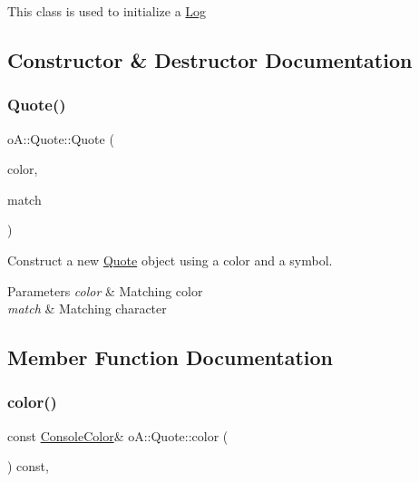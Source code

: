 This class is used to initialize a \mbox{\hyperlink{classo_a_1_1_log}{Log}} 

\subsection{Constructor \& Destructor Documentation}
\mbox{\label{classo_a_1_1_quote_a106d98164983c0d65e8b181275ab763b}} 
\subsubsection{\texorpdfstring{Quote()}{Quote()}}
{\footnotesize\ttfamily o\+A\+::\+Quote\+::\+Quote (\begin{DoxyParamCaption}\item[{const \mbox{\hyperlink{namespaceo_a_a747e07c1977a29f3e1d38683043ec927}{Console\+Color}} \&}]{color,  }\item[{char}]{match }\end{DoxyParamCaption})\hspace{0.3cm}{\ttfamily [inline]}}



Construct a new \mbox{\hyperlink{classo_a_1_1_quote}{Quote}} object using a color and a symbol. 


\begin{DoxyParams}{Parameters}
{\em color} & Matching color \\
\hline
{\em match} & Matching character \\
\hline
\end{DoxyParams}


\subsection{Member Function Documentation}
\mbox{\label{classo_a_1_1_quote_a2230c25c43af7317d5ab5785b382f2ce}} 
\subsubsection{\texorpdfstring{color()}{color()}}
{\footnotesize\ttfamily const \mbox{\hyperlink{namespaceo_a_a747e07c1977a29f3e1d38683043ec927}{Console\+Color}}\& o\+A\+::\+Quote\+::color (\begin{DoxyParamCaption}\item[{void}]{ }\end{DoxyParamCaption}) const\hspace{0.3cm}{\ttfamily [inline]}, {\ttfamily [noexcept]}}



